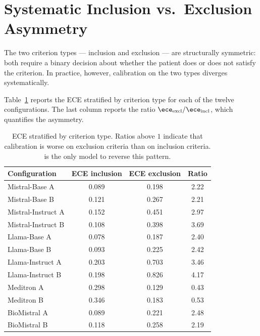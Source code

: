 \section{Systematic Inclusion vs.\ Exclusion Asymmetry}
\label{sec:res-asymmetry}

The two criterion types --- inclusion and exclusion --- are structurally 
symmetric: both require a binary decision about whether the patient does 
or does not satisfy the criterion. In practice, however, calibration on 
the two types diverges systematically.

Table~\ref{tab:res-asymmetry} reports the ECE stratified by criterion 
type for each of the twelve configurations. The last column reports the 
ratio $\ece_{\text{excl}} / \ece_{\text{incl}}$, which quantifies the 
asymmetry.

\begin{table}[htbp]
    \centering
    \caption{ECE stratified by criterion type. Ratios above $1$ indicate 
        that calibration is worse on exclusion criteria than on inclusion 
        criteria.  is the only model to reverse this 
        pattern.}
    \label{tab:res-asymmetry}
    \small
    \begin{tabular}{@{}lccc@{}}
        \toprule
        \textbf{Configuration} & 
        \textbf{ECE inclusion} & 
        \textbf{ECE exclusion} & 
        \textbf{Ratio} \\
        \midrule
        Mistral-Base A     & 0.089 & 0.198 & 2.22 \\
        Mistral-Base B     & 0.121 & 0.267 & 2.21 \\
        Mistral-Instruct A & 0.152 & 0.451 & 2.97 \\
        Mistral-Instruct B & 0.108 & 0.398 & 3.69 \\
        Llama-Base A       & 0.078 & 0.187 & 2.40 \\
        Llama-Base B       & 0.093 & 0.225 & 2.42 \\
        Llama-Instruct A   & 0.203 & 0.703 & 3.46 \\
        Llama-Instruct B   & 0.198 & 0.826 & 4.17 \\
        Meditron A         & 0.298 & 0.129 & 0.43 \\
        Meditron B         & 0.346 & 0.183 & 0.53 \\
        BioMistral A       & 0.089 & 0.221 & 2.48 \\
        BioMistral B       & 0.118 & 0.258 & 2.19 \\
        \bottomrule
    \end{tabular}
\end{table}

